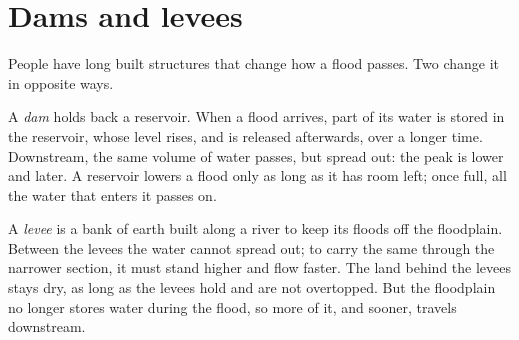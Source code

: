 \section{Dams and levees}

People have long built structures that change how a flood passes. Two
change it in opposite ways.

A \emph{dam} holds back a reservoir. When a flood arrives, part of its water
is stored in the reservoir, whose level rises, and is released afterwards,
over a longer time. Downstream, the same volume of water passes, but spread
out: the peak is lower and later. A reservoir lowers a flood only as long as
it has room left; once full, all the water that enters it passes on.

A \emph{levee} is a bank of earth built along a river to keep its floods off
the floodplain. Between the levees the water cannot spread out; to carry the
same  through the narrower section, it must stand higher and flow
faster. The land behind the levees stays dry, as long as the levees hold and
are not overtopped. But the floodplain no longer stores water during the
flood, so more of it, and sooner, travels downstream.

